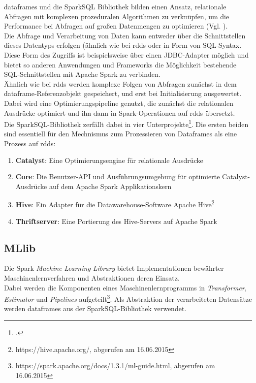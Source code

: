 \Glspl{dataframe} und die SparkSQL Bibliothek bilden einen Ansatz, relationale Abfragen mit komplexen prozeduralen Algorithmen zu verknüpfen, um die Performance bei Abfragen auf großen Datenmengen zu optimieren (Vgl. \cite{Armbrust:2015:SSR:2723372.2742797}).\\

Die Abfrage und Verarbeitung von Daten kann entweder über die Schnittstellen dieses Datentyps erfolgen (ähnlich wie bei \glspl{rdd} oder in Form von SQL-Syntax.\\

Diese Form des Zugriffs ist beispielsweise über einen JDBC-Adapter möglich und bietet so anderen Anwendungen und Frameworks die Möglichkeit bestehende SQL-Schnittstellen mit Apache Spark zu verbinden.\\

Ähnlich wie bei \glspl{rdd} werden komplexe Folgen von Abfragen zunächst in dem \gls{dataframe}-Referenzobjekt gespeichert, und erst bei Initialisierung ausgewertet. Dabei wird eine Optimierungspipeline genutzt, die zunächst die relationalen Ausdrücke optimiert und ihn dann in Spark-Operationen auf \glspl{rdd} übersetzt.\\

Die SparkSQL-Bibliothek zerfällt dabei in vier Unterprojekte\footcite{https://github.com/apache/spark/tree/branch-1.3/sql, abgerufen am 16.06.2015}. Die ersten beiden sind essentiell für den Mechnismus zum Prozessieren von Dataframes als eine Prozess auf \glspl{rdd}:
\begin{enumerate}
	\item \textbf{Catalyst}: Eine Optimierungsengine für relationale Ausdrücke
	\item \textbf{Core}: Die Benutzer-API und Ausführungsumgebung für optimierte Catalyst-Ausdrücke auf dem Apache Spark Applikationskern
	\item \textbf{Hive}: Ein Adapter für die Datawarehouse-Software Apache Hive\footnote{https://hive.apache.org/, abgerufen am 16.06.2015}
	\item \textbf{Thriftserver}: Eine Portierung des Hive-Servers auf Apache Spark
\end{enumerate}

\subsection{MLlib}
Die Spark \textit{Machine Learning Library} bietet Implementationen bewährter Maschinenlernverfahren und Abstraktionen deren Einsatz.\\
Dabei werden die Komponenten eines Maschinenlernprogramms in \textit{Transformer}, \textit{Estimator} und \textit{Pipelines} aufgeteilt\footnote{https://spark.apache.org/docs/1.3.1/ml-guide.html, abgerufen am 16.06.2015}. Als Abstraktion der verarbeiteten Datensätze werden \glspl{dataframe} aus der SparkSQL-Bibliothek verwendet.\\

